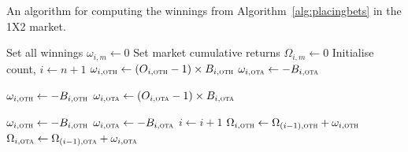 \documentclass[a4paper,10pt]{report}
\begin{document}
\begin{algorithm}
	\caption{An algorithm for computing the winnings from Algorithm~\ref{alg:placingbets} in the 1X2 market.} \label{alg:winningsot}
	\begin{algorithmic}[1]
		 
		\State Set all winnings $\omega_{i,m} \leftarrow 0$
		\State Set market cumulative returns $\Omega_{i,m}\leftarrow 0$
		\State Initialise count, $i \leftarrow n+1$ 
		 
		\State $\omega_{i, \textsc{oth}}\leftarrow (O_{i,\textsc{oth}} - 1)\times B_{i, \textsc{oth}}$ 
		\State $\omega_{i, \textsc{ota}}\leftarrow -B_{i, \textsc{ota}}$
		
		\State $\omega_{i, \textsc{oth}}\leftarrow -B_{i, \textsc{oth}}$
		\State $\omega_{i, \textsc{ota}}\leftarrow (O_{i,\textsc{ota}} - 1)\times B_{i, \textsc{ota}}$ 
		
		\Else {}
		\State $\omega_{i, \textsc{oth}}\leftarrow -B_{i, \textsc{oth}}$
		\State $\omega_{i, \textsc{ota}}\leftarrow -B_{i, \textsc{ota}}$
		\EndIf
		\State $i\leftarrow i + 1$ 
		\State $\Omega_{i,\textsc{oth}} \leftarrow \Omega_{(i-1),\textsc{oth}} + \omega_{i,\textsc{oth}}$ 
		\State $\Omega_{i,\textsc{ota}} \leftarrow \Omega_{(i-1),\textsc{ota}} + \omega_{i,\textsc{ota}}$
		\EndWhile
		\State{}
		\EndFunction
	\end{algorithmic}
\end{algorithm}

\pagebreak
\end{document}
